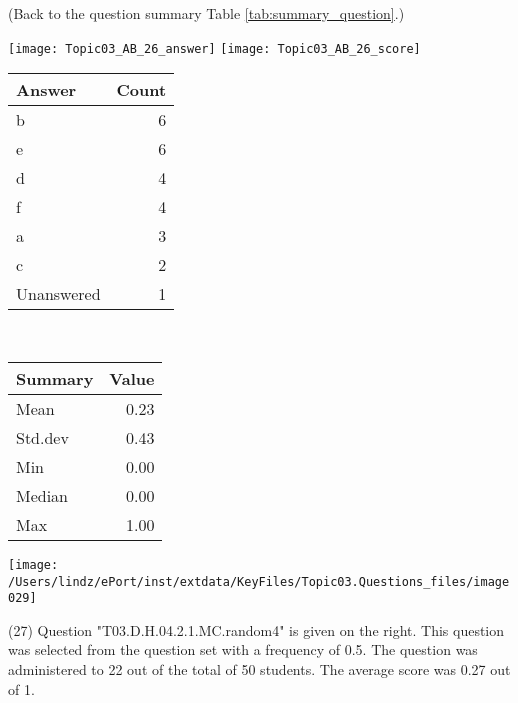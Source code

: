 \documentclass[12pt,english,nohyper]{tufte-handout}\usepackage[]{graphicx}\usepackage[]{color}
\begin{document}
 (Back to the question summary Table \ref{tab:summary_question}.)

\begin{center} \texttt{[image: Topic03\_AB\_26\_answer]} \texttt{[image: Topic03\_AB\_26\_score]} \end{center} 

\begin{center}%
\begin{tabular}{lr}
  \hline
Answer & Count \\ 
  \hline
b &   6 \\ 
  e &   6 \\ 
  d &   4 \\ 
  f &   4 \\ 
  a &   3 \\ 
  c &   2 \\ 
  Unanswered &   1 \\ 
   \hline
\end{tabular}
~~~~~~~~%
\begin{tabular}{lr}
  \hline
Summary & Value \\ 
  \hline
Mean & 0.23 \\ 
  Std.dev & 0.43 \\ 
  Min & 0.00 \\ 
  Median & 0.00 \\ 
  Max & 1.00 \\ 
   \hline
\end{tabular}
\end{center}\newpage{}



\vspace{4cm}\begin{marginfigure}\texttt{[image: /Users/lindz/ePort/inst/extdata/KeyFiles/Topic03.Questions\_files/image029]}\end{marginfigure}\vspace{-4cm} (27) Question "T03.D.H.04.2.1.MC.random4" is given on the right. This question was selected from the question set with a frequency of 0.5. The question was administered to 22 out of the total of 50 students. The average score was 0.27 out of 1.
\end{document}
